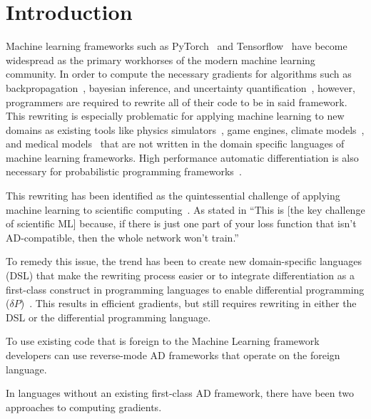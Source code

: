 \section{Introduction}
\label{sec:intro}

Machine learning frameworks such as PyTorch~\cite{paszke2017automatic} and Tensorflow~\cite{abadi2016tensorflow} have become widespread as the primary workhorses of the modern machine learning community. In order to compute the necessary gradients for algorithms such as backpropagation~\cite{hecht1992theory}, bayesian inference, and uncertainty quantification~\cite{Wang2018-yr}, however, programmers are required to rewrite all of their code to be in said framework. This rewriting is especially problematic for applying machine learning to new domains as existing tools like physics simulators~\cite{feng2016fastpm, broughton2020tensorflow, NIPS2018_7948, degrave2019differentiable, hu2019difftaichi}, game engines, climate models~\cite{Stevens2020-ir}, and medical models~\cite{alquraishi2019end} that are not written in the domain specific languages of machine learning frameworks. High performance automatic differentiation is also necessary for probabilistic programming frameworks~\cite{cusumano2019gen}.

This rewriting has been identified as the quintessential challenge of applying machine learning to scientific computing~\cite{Baker2019-ty}. As stated in \citet{10.15200/winn.156631.13064} ``This is [the key challenge of scientific ML] because, if there is just one part of your loss function that isn't AD-compatible, then the whole network won't train.''

To remedy this issue, the trend has been to create new domain-specific languages (DSL)  that make the rewriting process easier or to integrate differentiation as a first-class construct in programming languages to enable differential programming ($\delta P$)~\cite{maclaurin2015autograd,jax2018github,SwiftAutodiff,zygoteMlsys}. This results in efficient gradients, but still requires rewriting in either the DSL or the differential programming language. 


To use existing code that is foreign to the Machine Learning framework developers can use reverse-mode AD frameworks that operate on the foreign language. 


In languages without an existing first-class AD framework, there have been two approaches to computing gradients.

